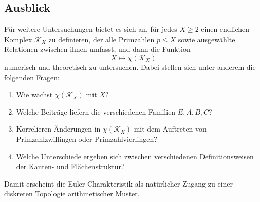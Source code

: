 \documentclass[11pt,a4paper]{article}
\theoremstyle{definition}
\theoremstyle{plain}
\theoremstyle{remark}
\begin{document}
	\subsection{Ausblick}
	
	Für weitere Untersuchungen bietet es sich an, für jedes \(X\geq 2\) einen endlichen Komplex \(\mathcal{K}_X\) zu definieren, der alle Primzahlen \(p\leq X\) sowie ausgewählte Relationen zwischen ihnen umfasst, und dann die Funktion
	\[
	X\longmapsto \chi(\mathcal{K}_X)
	\]
	numerisch und theoretisch zu untersuchen. Dabei stellen sich unter anderem die folgenden Fragen:
	\begin{enumerate}
		\item Wie wächst \(\chi(\mathcal{K}_X)\) mit \(X\)?
		\item Welche Beiträge liefern die verschiedenen Familien \(E,A,B,C\)?
		\item Korrelieren Änderungen in \(\chi(\mathcal{K}_X)\) mit dem Auftreten von Primzahlzwillingen oder Primzahlvierlingen?
		\item Welche Unterschiede ergeben sich zwischen verschiedenen Definitionsweisen der Kanten- und Flächenstruktur?
	\end{enumerate}
	
	Damit erscheint die Euler-Charakteristik als natürlicher Zugang zu einer diskreten Topologie arithmetischer Muster.
	
\end{document}
